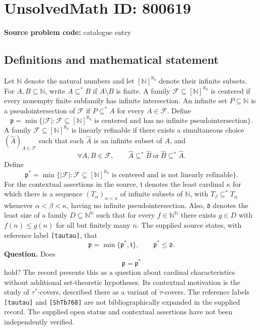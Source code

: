 \documentclass[11pt]{article}
\newcommand{\N}{\mathbb{N}}
\begin{document}
\section*{UnsolvedMath ID: 800619}
\textbf{Source problem code:} catalogue entry
\subsection{Definitions and mathematical statement}
Let \(\N\) denote the natural numbers and let \([\N]^{\aleph_0}\) denote their infinite subsets. For \(A,B\subseteq\N\), write \(A\subseteq^* B\) if \(A\setminus B\) is finite. A family \(\mathcal F\subseteq[\N]^{\aleph_0}\) is centered if every nonempty finite subfamily has infinite intersection. An infinite set \(P\subseteq\N\) is a pseudointersection of \(\mathcal F\) if \(P\subseteq^* A\) for every \(A\in\mathcal F\). Define
\[
\mathfrak p=\min\bigl\{|\mathcal F|:\mathcal F\subseteq[\N]^{\aleph_0}\text{ is centered and has no infinite pseudointersection}\bigr\}.
\]
A family \(\mathcal F\subseteq[\N]^{\aleph_0}\) is linearly refinable if there exists a simultaneous choice \((\widehat A)_{A\in\mathcal F}\) such that each \(\widehat A\) is an infinite subset of \(A\), and
\[
\forall A,B\in\mathcal F,\qquad
\widehat A\subseteq^*\widehat B\ \text{or}\ \widehat B\subseteq^*\widehat A.
\]
Define
\[
\mathfrak p^*=\min\bigl\{|\mathcal F|:\mathcal F\subseteq[\N]^{\aleph_0}\text{ is centered and is not linearly refinable}\bigr\}.
\]
For the contextual assertions in the source, \(\mathfrak t\) denotes the least cardinal \(\kappa\) for which there is a sequence \((T_\alpha)_{\alpha<\kappa}\) of infinite subsets of \(\N\), with \(T_\beta\subseteq^*T_\alpha\) whenever \(\alpha<\beta<\kappa\), having no infinite pseudointersection. Also, \(\mathfrak d\) denotes the least size of a family \(D\subseteq\N^{\N}\) such that for every \(f\in\N^{\N}\) there exists \(g\in D\) with \(f(n)\leq g(n)\) for all but finitely many \(n\). The supplied source states, with reference label \texttt{[tautau]}, that
\[
\mathfrak p=\min\{\mathfrak p^*,\mathfrak t\},\qquad \mathfrak p^*\leq\mathfrak d.
\]
\textbf{Question.} Does
\[
\mathfrak p=\mathfrak p^*
\]
hold? The record presents this as a question about cardinal characteristics without additional set-theoretic hypotheses. Its contextual motivation is the study of \(\tau^*\)-covers, described there as a variant of \(\tau\)-covers. The reference labels \texttt{[tautau]} and \texttt{[ShTb768]} are not bibliographically expanded in the supplied record. The supplied open status and contextual assertions have not been independently verified.
\end{document}
